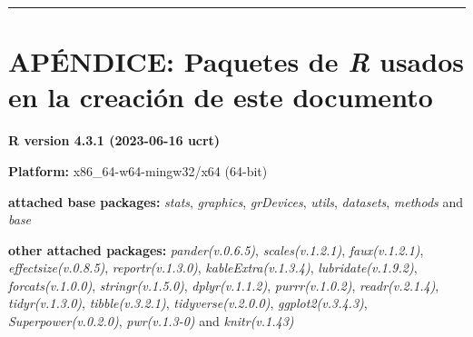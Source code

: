 \documentclass[
]{article}
\begin{document}
\begin{center}\rule{0.5\linewidth}{0.5pt}\end{center}

\newpage

\hypertarget{apuxe9ndice-paquetes-de-r-usados-en-la-creaciuxf3n-de-este-documento}{%
\section*{\texorpdfstring{APÉNDICE: Paquetes de \emph{R} usados en la
creación de este
documento}{APÉNDICE: Paquetes de R usados en la creación de este documento}}\label{apuxe9ndice-paquetes-de-r-usados-en-la-creaciuxf3n-de-este-documento}}

\textbf{R version 4.3.1 (2023-06-16 ucrt)}

\textbf{Platform:} x86\_64-w64-mingw32/x64 (64-bit)

\textbf{attached base packages:} \emph{stats}, \emph{graphics},
\emph{grDevices}, \emph{utils}, \emph{datasets}, \emph{methods} and
\emph{base}

\textbf{other attached packages:} \emph{pander(v.0.6.5)},
\emph{scales(v.1.2.1)}, \emph{faux(v.1.2.1)},
\emph{effectsize(v.0.8.5)}, \emph{reportr(v.1.3.0)},
\emph{kableExtra(v.1.3.4)}, \emph{lubridate(v.1.9.2)},
\emph{forcats(v.1.0.0)}, \emph{stringr(v.1.5.0)}, \emph{dplyr(v.1.1.2)},
\emph{purrr(v.1.0.2)}, \emph{readr(v.2.1.4)}, \emph{tidyr(v.1.3.0)},
\emph{tibble(v.3.2.1)}, \emph{tidyverse(v.2.0.0)},
\emph{ggplot2(v.3.4.3)}, \emph{Superpower(v.0.2.0)}, \emph{pwr(v.1.3-0)}
and \emph{knitr(v.1.43)}
\end{document}
